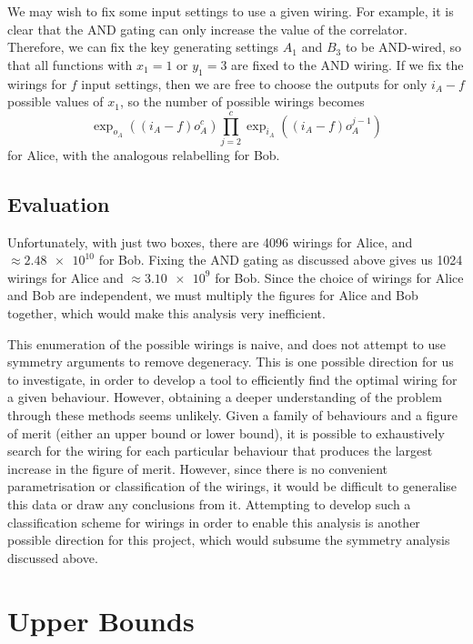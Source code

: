 \documentclass[10pt, a4paper]{article}
\newcommand{\?}{\mathrel{?}} %
\numberwithin{equation}{section} %
\theoremstyle{definition}
\theoremstyle{plain}
\theoremstyle{plain}
\begin{document}
    We may wish to fix some input settings to use a given wiring. For example, it is clear that the AND gating can only increase the value of the correlator. Therefore, we can fix the key generating settings \(A_1\) and \(B_3\) to be AND-wired, so that all functions with \(x_1 = 1\) or \(y_1 = 3\) are fixed to the AND wiring. If we fix the wirings for \(f\) input settings, then we are free to choose the outputs for only \(i_A - f\) possible values of \(x_1\), so the number of possible wirings becomes
    \begin{equation}
      \exp_{o_A}((i_A-f) o_A^c) \prod_{j=2}^c \exp_{i_A}((i_A-f) o_A^{j-1})
    \end{equation}
    for Alice, with the analogous relabelling for Bob.

    \subsection{Evaluation}

    Unfortunately, with just two boxes, there are 4096 wirings for Alice, and \(\approx \num{2.48e10}\) for Bob. Fixing the AND gating as discussed above gives us 1024 wirings for Alice and \(\approx \num{3.10e9}\) for Bob. Since the choice of wirings for Alice and Bob are independent, we must multiply the figures for Alice and Bob together, which would make this analysis very inefficient.

    This enumeration of the possible wirings is naive, and does not attempt to use symmetry arguments to remove degeneracy. This is one possible direction for us to investigate, in order to develop a tool to efficiently find the optimal wiring for a given behaviour. However, obtaining a deeper understanding of the problem through these methods seems unlikely. Given a family of behaviours and a figure of merit (either an upper bound or lower bound), it is possible to exhaustively search for the wiring for each particular behaviour that produces the largest increase in the figure of merit. However, since there is no convenient parametrisation or classification of the wirings, it would be difficult to generalise this data or draw any conclusions from it. Attempting to develop such a classification scheme for wirings in order to enable this analysis is another possible direction for this project, which would subsume the symmetry analysis discussed above.

  \section{Upper Bounds}
\end{document}
